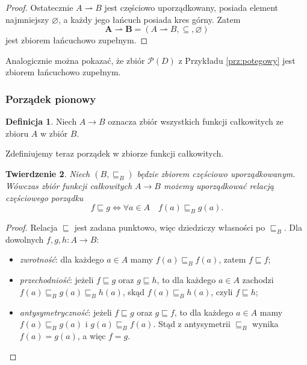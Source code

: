 \documentclass[11pt,a4paper]{article}
\theoremstyle{definition}
\newtheorem{definicja}{Definicja}[section]
\theoremstyle{plain}
\newtheorem{twierdzenie}[definicja]{Twierdzenie}
\begin{document}
\begin{proof}
	Ostatecznie $A\rightharpoonup B$ jest częściowo uporządkowany,
	posiada element najmniejszy $\varnothing$, a każdy jego łańcuch
	posiada kres górny. Zatem
	\[
	\boldsymbol{A\rightharpoonup B}
	=
	(A\rightharpoonup B,\subseteq,\varnothing)
	\]
	jest zbiorem łańcuchowo zupełnym.
\end{proof}

Analogicznie można pokazać, że zbiór $\mathcal{P}(D)$ z Przykładu \ref{prz:potegowy} jest zbiorem łańcuchowo zupełnym.

\subsubsection{Porządek pionowy}

\begin{definicja}\label{def:zbior_funkcji_calkowitych}
	Niech $A \to B$ oznacza zbiór wszystkich funkcji całkowitych ze zbioru $A$ w zbiór $B$.
\end{definicja}

Zdefiniujemy teraz porządek w zbiorze funkcji całkowitych.

\begin{twierdzenie}\label{tw:zbior_funkcji_calkowitych_czesciowo_uporzadkowany}
	Niech $(B, \sqsubseteq_B)$ będzie zbiorem częściowo uporządkowanym. Wówczas zbiór funkcji całkowitych $A \to B$ możemy uporządkować relacją częściowego porządku
	\[
		f\sqsubseteq g \iff \forall a\in A\quad f(a)\sqsubseteq_B g(a).
	\]
\end{twierdzenie}

\begin{proof}
	Relacja $\sqsubseteq$ jest zadana punktowo, więc dziedziczy własności po $\sqsubseteq_B$. Dla dowolnych $f,g,h:A\to B$:
	\begin{itemize}
		\item[(1)] \emph{zwrotność}: dla każdego $a\in A$ mamy
		$f(a)\sqsubseteq_B f(a)$, zatem $f\sqsubseteq f$;
		\item[(2)] \emph{przechodniość}: jeżeli $f\sqsubseteq g$ oraz
		$g\sqsubseteq h$, to dla każdego $a \in A$ zachodzi
		$f(a)\sqsubseteq_B g(a)\sqsubseteq_B h(a)$, skąd
		$f(a)\sqsubseteq_B h(a)$, czyli $f\sqsubseteq h$;
		\item[(3)] \emph{antysymetryczność}: jeżeli $f\sqsubseteq g$ oraz
		$g\sqsubseteq f$, to dla każdego $a \in A$ mamy $f(a)\sqsubseteq_B g(a)$
		i $g(a)\sqsubseteq_B f(a)$. Stąd z antysymetrii $\sqsubseteq_B$ wynika
		$f(a)=g(a)$, a więc $f=g$.
	\end{itemize}
\end{proof}
\end{document}
